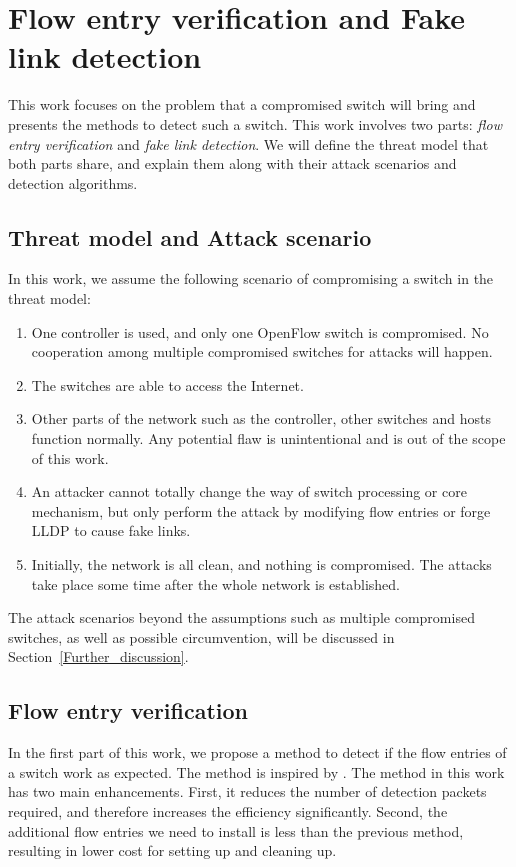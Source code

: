 \chapter{Flow entry verification and Fake link detection}
This work focuses on the problem that a compromised switch will bring and presents the methods to detect such a switch. This work involves two parts: \textit{flow entry verification} and \textit{fake link detection}. We will define the threat model that both parts share, and explain them along with their attack scenarios and detection algorithms.

\section{Threat model and Attack scenario}
In this work, we assume the following scenario of compromising a switch in the threat model:
\begin{enumerate}
\item
One controller is used, and only one OpenFlow switch is compromised. No cooperation among multiple compromised switches for attacks will happen.
\item
The switches are able to access the Internet. 
\item
Other parts of the network such as the controller, other switches and hosts function normally. Any potential flaw is unintentional and is out of the scope of this work.
\item
An attacker cannot totally change the way of switch processing or core mechanism, but only perform the attack by modifying flow entries or forge LLDP to cause fake links.
\item
Initially, the network is all clean, and nothing is compromised. The attacks take place some time after the whole network is established.
\end{enumerate}

The attack scenarios beyond the assumptions such as multiple compromised switches, as well as possible circumvention, will be discussed in Section~\ref{Further_discussion}.

\section{Flow entry verification}
In the first part of this work, we propose a method to detect if the flow entries of a switch work as expected. The method is inspired by \cite{CKGL15}. The method in this work has two main enhancements. First, it reduces the number of detection packets required, and therefore increases the efficiency significantly. Second, the additional flow entries we need to install is less than the previous method, resulting in lower cost for setting up and cleaning up. 

